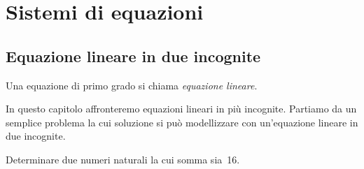 


\chapter{Sistemi di equazioni}

\section{Equazione lineare in due incognite}
\label{sec:sist_eqdue}

\begin{definizione}
Una equazione di primo grado si chiama \emph{equazione lineare}.
\end{definizione}

In questo capitolo affronteremo equazioni lineari in più incognite. Partiamo 
da un semplice problema la cui soluzione si può modellizzare con un'equazione 
lineare in due incognite.

\begin{problema}
Determinare due numeri naturali la cui somma sia~16.
\end{problema}

